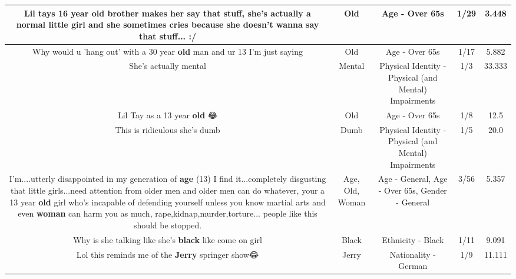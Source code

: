 \documentclass[11pt]{article}
\newlength\mylength
\begin{document}
\begin{center}
\begin{longtable}{|C{.65\mylength}|C{.30\mylength}|C{.12\mylength}|C{.12\mylength}|C{.12\mylength}|}
  \small Lil tays 16 year \textbf{old} brother makes her say that stuff, she's actually a normal little girl and she sometimes cries because she doesn't wanna say that stuff... :/\normalsize   & Old & Age - Over 65s & 1/29 & 3.448 \\  \hline
  \small Why would u 'hang out' with a 30 year \textbf{old} man and ur 13 I'm just saying\normalsize   & Old & Age - Over 65s & 1/17 & 5.882 \\  \hline
  \small She's actually mental\normalsize   & Mental & Physical Identity - Physical (and Mental) Impairments & 1/3 & 33.333 \\  \hline
  \small Lil Tay as a 13 year \textbf{old} 😂\normalsize   & Old & Age - Over 65s & 1/8 & 12.5 \\  \hline
  \small This is ridiculous she's dumb\normalsize   & Dumb & Physical Identity - Physical (and Mental) Impairments & 1/5 & 20.0 \\  \hline
  \small I'm....utterly disappointed in my generation of \textbf{age} (13) I find it...completely disgusting that little girls...need attention from older men and older men can do whatever, your a 13 year \textbf{old} girl who's incapable of defending yourself unless you know martial arts and even \textbf{woman} can harm you as much, rape,kidnap,murder,torture... people like this should be stopped.\normalsize   & Age, Old, Woman & Age - General, Age - Over 65s, Gender - General & 3/56 & 5.357 \\  \hline
  \small Why is she talking like she's \textbf{black} like come on girl\normalsize   & Black & Ethnicity - Black & 1/11 & 9.091 \\  \hline
  \small Lol this reminds me of the \textbf{Jerry} springer show😂\normalsize   & Jerry & Nationality - German & 1/9 & 11.111 \\  \hline

\end{longtable}
\end{center}
\end{document}
